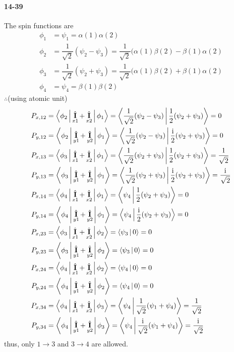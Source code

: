\documentclass[a4paper]{article}
\DeclareMathOperator{\I}{\mathrm{i}}
\DeclareMathOperator{\ra}{\rightarrow}
\DeclareMathOperator{\hI}{\hat{\vb{I}}}
\newcommand{\ex}[1]{\paragraph{14-#1}}
\numberwithin{equation}{section}
\begin{document}
\ex{39}
The spin functions are
\begin{align}
\phi_1 &= \psi_1 = \alpha(1)\alpha(2) \\
\phi_2 &= \dfrac{1}{\sqrt{2}}(\psi_2 - \psi_3) = \dfrac{1}{\sqrt{2}}(\alpha(1)\beta(2) - \beta(1)\alpha(2) \\
\phi_3 &= \dfrac{1}{\sqrt{2}}(\psi_2 + \psi_3) = \dfrac{1}{\sqrt{2}}(\alpha(1)\beta(2) + \beta(1)\alpha(2) \\ 
\phi_4 &= \psi_4 = \beta(1)\beta(2)
\end{align}
$ \therefore $(using atomic unit)
\begin{align}
P_{x,12} &= \Braket{\phi_2 | \hI_{x1} + \hI_{x2} | \phi_1} = \Braket{\dfrac{1}{\sqrt{2}}(\psi_2 - \psi_3) | \dfrac{1}{2}(\psi_2 + \psi_3)} = 0\\
P_{y,12} &= \Braket{\phi_2 | \hI_{y1} + \hI_{y2} | \phi_1} = \Braket{\dfrac{1}{\sqrt{2}}(\psi_2 - \psi_3) | \dfrac{\I}{2}(\psi_2 + \psi_3)} = 0\\
P_{x,13} &= \Braket{\phi_3 | \hI_{x1} + \hI_{x2} | \phi_1} = \Braket{\dfrac{1}{\sqrt{2}}(\psi_2 + \psi_3) | \dfrac{1}{2}(\psi_2 + \psi_3)} = \dfrac{1}{\sqrt{2}}\\
P_{y,13} &= \Braket{\phi_3 | \hI_{y1} + \hI_{y2} | \phi_1} = \Braket{\dfrac{1}{\sqrt{2}}(\psi_2 + \psi_3) | \dfrac{\I}{2}(\psi_2 + \psi_3)} = \dfrac{\I}{\sqrt{2}}\\
P_{x,14} &= \Braket{\phi_4 | \hI_{x1} + \hI_{x2} | \phi_1} = \Braket{\psi_4 | \dfrac{1}{2}(\psi_2 + \psi_3)} = 0\\
P_{y,14} &= \Braket{\phi_4 | \hI_{y1} + \hI_{y2} | \phi_1} = \Braket{\psi_4 | \dfrac{\I}{2}(\psi_2 + \psi_3)} = 0\\
P_{x,23} &= \Braket{\phi_3 | \hI_{x1} + \hI_{x2} | \phi_2} = \Braket{\psi_3 | 0} = 0\\
P_{y,23} &= \Braket{\phi_3 | \hI_{y1} + \hI_{y2} | \phi_2} = \Braket{\psi_3 | 0} = 0\\
P_{x,24} &= \Braket{\phi_4 | \hI_{x1} + \hI_{x2} | \phi_2} = \Braket{\psi_4 | 0} = 0\\
P_{y,24} &= \Braket{\phi_4 | \hI_{y1} + \hI_{y2} | \phi_2} = \Braket{\psi_4 | 0} = 0\\
P_{x,34} &= \Braket{\phi_4 | \hI_{x1} + \hI_{x2} | \phi_3} = \Braket{\psi_4 | \dfrac{1}{\sqrt{2}}(\psi_1 + \psi_4)} = \dfrac{1}{\sqrt{2}}\\
P_{y,34} &= \Braket{\phi_4 | \hI_{y1} + \hI_{y2} | \phi_3} = \Braket{\psi_4 | \dfrac{\I}{\sqrt{2}}(\psi_1 + \psi_4)} = \dfrac{\I}{\sqrt{2}}
\end{align}
thus, only $ 1\ra 3 $ and $ 3\ra 4 $ are allowed.
\end{document}
